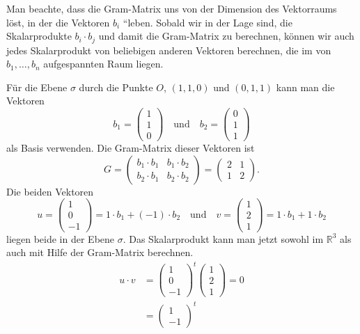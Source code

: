 Man beachte, dass die Gram-Matrix uns von der Dimension des 
Vektorraums löst, in der die Vektoren $b_i$ ``leben.
Sobald wir in der Lage sind, die Skalarprodukte $b_i\cdot b_j$ 
und damit die Gram-Matrix zu berechnen, können wir auch jedes
Skalarprodukt von beliebigen anderen Vektoren berechnen, die im
von $b_1,\dots,b_n$ aufgespannten Raum liegen.

\begin{beispiel}
Für die Ebene $\sigma$ durch die Punkte $O$, $(1,1,0)$ und $(0,1,1)$
kann man die Vektoren \[
b_1 = \begin{pmatrix} 1\\1\\0\end{pmatrix}
\quad\text{und}\quad
b_2 = \begin{pmatrix} 0\\1\\1\end{pmatrix}
\]
als Basis verwenden.
Die Gram-Matrix dieser Vektoren ist
\[
G = \begin{pmatrix}
b_1\cdot b_1 & b_1\cdot b_2\\
b_2\cdot b_1 & b_2\cdot b_2
\end{pmatrix}
=
\begin{pmatrix}
2&1\\
1&2
\end{pmatrix}.
\]
Die beiden Vektoren
\[
u
=
\begin{pmatrix}
1\\0\\-1
\end{pmatrix}
=
1\cdot b_1 + (-1)\cdot b_2
\quad\text{und}\quad
v
=
\begin{pmatrix}
1\\2\\1
\end{pmatrix}
=
1\cdot b_1 + 1 \cdot b_2
\]
liegen beide in der Ebene $\sigma$.
Das Skalarprodukt kann man jetzt sowohl im $\mathbb{R}^3$ als auch mit
Hilfe der Gram-Matrix berechnen.
\begin{align*}
u\cdot v
&=
\begin{pmatrix}
1\\0\\-1
\end{pmatrix}^t
\begin{pmatrix}
1\\2\\1
\end{pmatrix}
=0
\\
&=
\begin{pmatrix}1\\-1\end{pmatrix}^t

\end{align*}
\end{beispiel}
